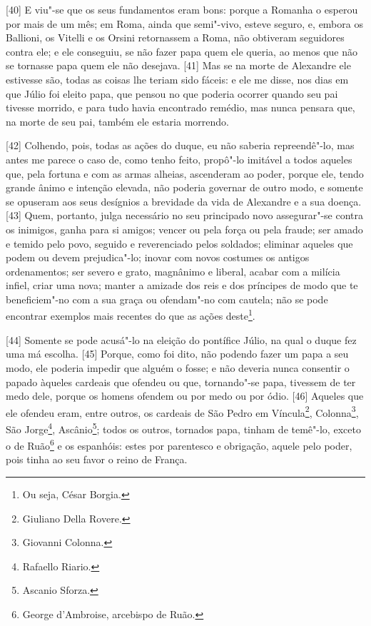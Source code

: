 {[}40{]} E viu"-se que os seus fundamentos eram bons: porque a Romanha o
esperou por mais de um mês; em Roma, ainda que semi"-vivo, esteve seguro,
e, embora os Ballioni, os Vitelli e os Orsini retornassem a Roma, não
obtiveram seguidores contra ele; e ele conseguiu, se não fazer papa quem
ele queria, ao menos que não se tornasse papa quem ele não desejava.
{[}41{]} Mas se na morte de Alexandre ele estivesse são, todas as coisas
lhe teriam sido fáceis: e ele me disse, nos dias em que Júlio  foi
eleito papa, que pensou no que poderia ocorrer quando seu pai tivesse
morrido, e para tudo havia encontrado remédio, mas nunca pensara que, na
morte de seu pai, também ele estaria morrendo.

{[}42{]} Colhendo, pois, todas as ações do duque, eu não saberia
repreendê"-lo, mas antes me parece o caso de, como tenho feito, propô"-lo
imitável a todos aqueles que, pela fortuna e com as armas alheias,
ascenderam ao poder, porque ele, tendo grande ânimo e intenção elevada,
não poderia governar de outro modo, e somente se opuseram aos seus
desígnios a brevidade da vida de Alexandre e a sua doença. {[}43{]}
Quem, portanto, julga necessário no seu principado novo assegurar"-se
contra os inimigos, ganha para si amigos; vencer ou pela força ou pela
fraude; ser amado e temido pelo povo, seguido e reverenciado pelos
soldados; eliminar aqueles que podem ou devem prejudica"-lo; inovar com
novos costumes os antigos ordenamentos; ser severo e grato, magnânimo e
liberal, acabar com a milícia infiel, criar uma nova; manter a amizade
dos reis e dos príncipes de modo que te beneficiem"-no com a sua graça ou
ofendam"-no com cautela; não se pode encontrar exemplos mais recentes do
que as ações deste\footnote{Ou seja, César Borgia.}.

{[}44{]} Somente se pode acusá"-lo na eleição do pontífice Júlio, na qual
o duque fez uma má escolha. {[}45{]} Porque, como foi dito, não podendo
fazer um papa a seu modo, ele poderia impedir que alguém o fosse; e não
deveria nunca consentir o papado àqueles cardeais que ofendeu ou que,
tornando"-se papa, tivessem de ter medo dele, porque os homens ofendem ou
por medo ou por ódio. {[}46{]} Aqueles que ele ofendeu eram, entre
outros, os cardeais de São Pedro em Víncula\footnote{Giuliano Della
  Rovere.}, Colonna\footnote{Giovanni Colonna.}, São Jorge\footnote{Rafaello
  Riario.}, Ascânio\footnote{Ascanio Sforza.}; todos os outros, tornados
papa, tinham de temê"-lo, exceto o de Ruão\footnote{George d'Ambroise,
  arcebispo de Ruão.} e os espanhóis: estes por parentesco e obrigação,
aquele pelo poder, pois tinha ao seu favor o reino de França.

